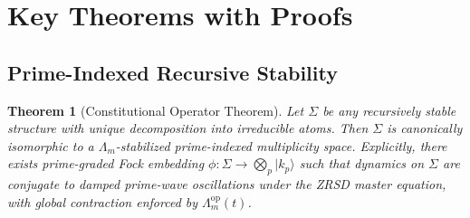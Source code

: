 \documentclass[11pt,a4paper]{article}
\theoremstyle{plain}
\newtheorem{theorem}{Theorem}[section]
\theoremstyle{definition}
\theoremstyle{remark}
\begin{document}
\section{Key Theorems with Proofs}\label{sec:proofs}

\subsection{Prime-Indexed Recursive Stability}

\begin{theorem}[Constitutional Operator Theorem]\label{thm:stability}
Let \(\Sigma\) be any recursively stable structure with unique decomposition into irreducible atoms. Then \(\Sigma\) is canonically isomorphic to a \(\Lambda_m\)-stabilized prime-indexed multiplicity space. Explicitly, there exists prime-graded Fock embedding \(\phi: \Sigma \to \bigotimes_p |k_p\rangle\) such that dynamics on \(\Sigma\) are conjugate to damped prime-wave oscillations under the ZRSD master equation, with global contraction enforced by \(\Lambda_m^{\text{op}}(t)\).
\end{theorem}
\end{document}
